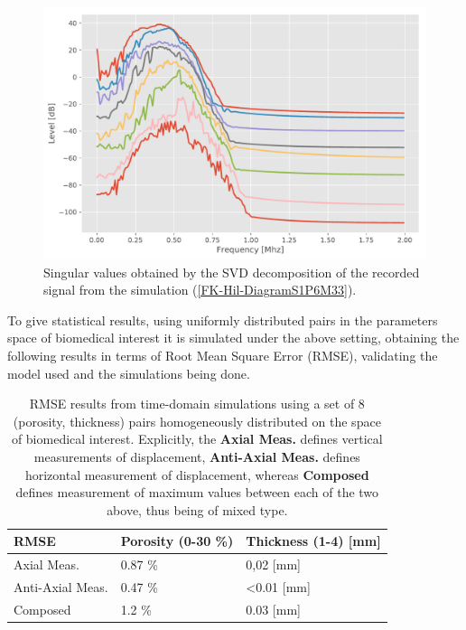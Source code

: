 \begin{figure}[!h]  
	\centering
	\includegraphics[scale=.5]{images/TimeSingSous/2DTimeHilb_P6Elastic33_SV.pdf}
	\caption{Singular values obtained by the SVD decomposition of the recorded signal from the simulation (\ref{FK-Hil-DiagramS1P6M33}).}
	\label{SVD-Hil-S1P7M33}
\end{figure}

To give statistical results, using uniformly distributed pairs in the parameters space of biomedical interest it is simulated under the above setting, obtaining the following results in terms of Root Mean Square Error (RMSE), validating the model used and the simulations being done.

\begin{table}[!h]
\centering
    \begin{tabular}{l l l}
    \toprule
    \textbf{RMSE} & \textbf{Porosity} (0-30 \%) & \textbf{Thickness} (1-4) [mm]\\
    \midrule
    Axial Meas. & 0.87 \% & 0,02  [mm]\\
    Anti-Axial Meas. & 0.47 \%  & <0.01 [mm]\\
    Composed & 1.2 \% & 0.03 [mm] \\
    \bottomrule
    \end{tabular}
    \caption{RMSE results from time-domain simulations using a set of 8 (porosity, thickness) pairs homogeneously distributed on the space of biomedical interest. Explicitly, the \textbf{Axial Meas.} defines vertical measurements of displacement, \textbf{Anti-Axial Meas.} defines horizontal measurement of displacement, whereas \textbf{Composed} defines measurement of maximum values between each of the two above, thus being of mixed type.} 
    \label{TimeInvTable}
\end{table}

